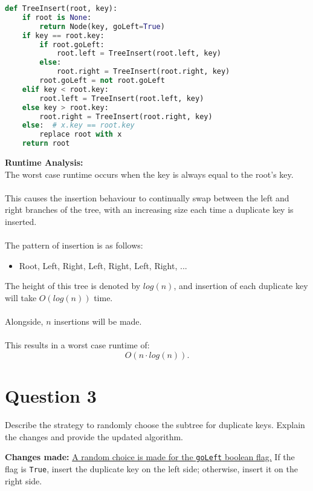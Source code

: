 \documentclass[12pt]{article}
\begin{document}
\begin{lstlisting}[language=Python, caption={Modified TreeInsert with goLeft Flag}]
def TreeInsert(root, key):
    if root is None:
        return Node(key, goLeft=True)
    if key == root.key:
        if root.goLeft:
            root.left = TreeInsert(root.left, key)
        else:
            root.right = TreeInsert(root.right, key)
        root.goLeft = not root.goLeft
    elif key < root.key:
        root.left = TreeInsert(root.left, key)
    else key > root.key:
        root.right = TreeInsert(root.right, key)
    else:  # x.key == root.key
        replace root with x
    return root
\end{lstlisting}
\textbf{Runtime Analysis:} \\
The worst case runtime occurs when the key is always equal to the root's key. \\
\\
This causes the insertion behaviour to continually swap between the left and right branches of the tree, with an increasing size each time a duplicate key is inserted. \\
\\
The pattern of insertion is as follows:
\begin{itemize}
    \item Root, Left, Right, Left, Right, Left, Right, ...
\end{itemize}
The height of this tree is denoted by \( log(n) \), and insertion of each duplicate key will take \( O(log(n)) \) time. \\
\\
Alongside, \( n \) insertions will be made. \\
\\
This results in a worst case runtime of:
\[
    O(n \cdot log(n)) \text{.}
\]
\pagebreak

\section*{Question 3}
Describe the strategy to randomly choose the subtree for duplicate keys. Explain the changes and provide the updated algorithm.

\vspace{1em} %
\textbf{Changes made:} \underline{A random choice is made for the \texttt{goLeft} boolean flag.} If the flag is \texttt{True}, insert the duplicate key on the left side; otherwise, insert it on the right side.
\end{document}
